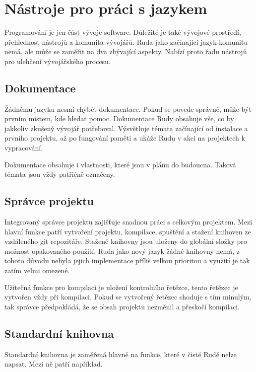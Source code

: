 \documentclass[12pt, a4paper,
twoside,        %
openright
]{report}
\let\oldchapter\chapter
\renewcommand{\chapter}{
	\clearpage
	\pagestyle{fancy}
	\oldchapter
}
\begin{document}
	\chapter{Nástroje pro práci s jazykem}
	
	Programování je jen část vývoje software. Důležité je také vývojové prostředí, přehlednost nástrojů a komunita vývojářů. Ruda jako začínající jazyk komunitu nemá, ale může se zaměřit na dva zbývající aspekty. Nabízí proto řadu nástrojů pro ulehčení vývojářského procesu.
	
	\section{Dokumentace}
	
	Žádnému jazyku nesmí chybět dokumentace. Pokud se povede správně, může být prvním místem, kde hledat pomoc. Dokumentace Rudy obsahuje vše, co by jakkoliv zkušený vývojář potřeboval. Výsvětluje témata začínající od instalace a prvního projektu, až po fungování paměti a ukáže Rudu v akci na projektech k vypracování.
	
	Dokumentace obsahuje i vlastnosti, které jsou v plánu do budoucna. Taková témata jsou vždy patřičně označeny.
	
	\section{Správce projektu}
	
	Integrovaný správce projektu zajišťuje snadnou práci s celkovým projektem. Mezi hlavní funkce patří vytvoření projektu, kompilace, spuštění a stažení knihoven ze vzdáleného git repozitáře. Stažené knihovny jsou uloženy do globální složky pro možnost opakovaného použití. Ruda jako nový jazyk žádné knihovny nemá, z tohoto důvodu nebyla jejich implementace příliš velkou prioritou a využití je tak zatím velmi omezené.
	
	Užitečná funkce pro kompilaci je uložení kontrolního řetězce, tento řetězec je vytvořen vždy při kompilaci. Pokud se vytvořený řetězec shoduje s tím minulým, tak správce předpokládá, že se obsah projektu nezměnil a přeskočí kompilaci.
	
	\clearpage
	
	\section{Standardní knihovna}
	
	Standardní knihovna je zaměřená hlavně na funkce, které v čisté Rudě nelze napsat. 
	Mezi ně patří například.
	
\end{document}
